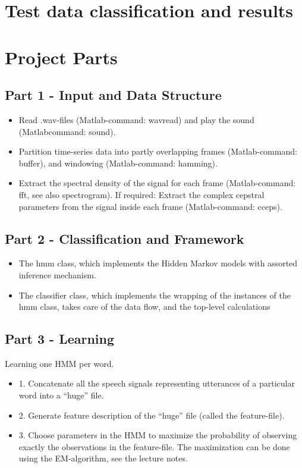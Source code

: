 \documentclass[titlepage]{article}
\begin{document}
\section{Test data classification and results}


\section{Project Parts}
	\subsection{Part 1 - Input and Data Structure}
\begin{itemize}
\item Read .wav-ﬁles (Matlab-command: wavread) and play the sound (Matlabcommand: sound).
\item Partition time-series data into partly overlapping frames (Matlab-command:
buffer), and windowing (Matlab-command: hamming).
\item Extract the spectral density of the signal for each frame (Matlab-command:
fft, see also spectrogram). If required: Extract the complex cepstral parameters from the signal inside each frame (Matlab-command: cceps).
\end{itemize}

	\subsection{Part 2 - Classification and Framework}
\begin{itemize}
\item The hmm class, which implements the Hidden Markov models with assorted inference mechanism.
\item The classifier class, which implements the wrapping of the instances of the hmm class, takes care of the data ﬂow, and the top-level calculations
\end{itemize}	

    \subsection{Part 3 - Learning}
Learning one HMM per word. 
\begin{itemize}
\item 1. Concatenate all the speech signals representing utterances of a particular word into a “huge” ﬁle.
\item 2. Generate feature description of the “huge” ﬁle (called the feature-ﬁle).
\item 3. Choose parameters in the HMM to maximize the probability of observing exactly the observations in the feature-ﬁle. The maximization can be done using the EM-algorithm, see the lecture notes.
\end{itemize}
\end{document}
